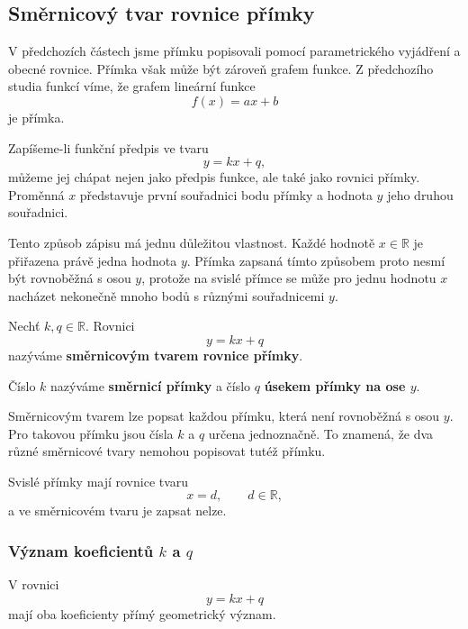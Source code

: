 \subsection{Směrnicový tvar rovnice přímky}
\label{subsec:Slope_intercept_line_equation}

V předchozích částech jsme přímku popisovali pomocí parametrického
vyjádření a obecné rovnice. Přímka však může být zároveň grafem funkce.
Z předchozího studia funkcí víme, že grafem lineární funkce
\[
    f(x)=ax+b
\]
je přímka.

Zapíšeme-li funkční předpis ve tvaru
\[
    y=kx+q,
\]
můžeme jej chápat nejen jako předpis funkce, ale také jako rovnici
přímky. Proměnná $x$ představuje první souřadnici bodu přímky
a hodnota $y$ jeho druhou souřadnici.

Tento způsob zápisu má jednu důležitou vlastnost. Každé hodnotě
$x\in\mathbb{R}$ je přiřazena právě jedna hodnota $y$. Přímka zapsaná
tímto způsobem proto nesmí být rovnoběžná s osou $y$, protože na svislé
přímce se může pro jednu hodnotu $x$ nacházet nekonečně mnoho bodů
s různými souřadnicemi $y$.

\begin{definition}\label{def:Slope_intercept_line_equation}
    Nechť $k,q\in\mathbb{R}$. Rovnici
    \begin{equation}\label{eq:Slope_intercept_line_equation}
        y=kx+q
    \end{equation}
    nazýváme \textbf{směrnicovým tvarem rovnice přímky}.

    Číslo $k$ nazýváme \textbf{směrnicí přímky} a číslo $q$
    \textbf{úsekem přímky na ose $y$}.
\end{definition}

Směrnicovým tvarem lze popsat každou přímku, která není rovnoběžná
s osou $y$. Pro takovou přímku jsou čísla $k$ a $q$ určena jednoznačně.
To znamená, že dva různé směrnicové tvary nemohou popisovat tutéž
přímku.

Svislé přímky mají rovnice tvaru
\[
    x=d,
    \qquad d\in\mathbb{R},
\]
a ve směrnicovém tvaru je zapsat nelze.

\subsubsection{Význam koeficientů \texorpdfstring{$k$}{k} a \texorpdfstring{$q$}{q}}
\label{subsubsec:Meaning_slope_intercept_coefficients}

V rovnici
\[
    y=kx+q
\]
mají oba koeficienty přímý geometrický význam.

